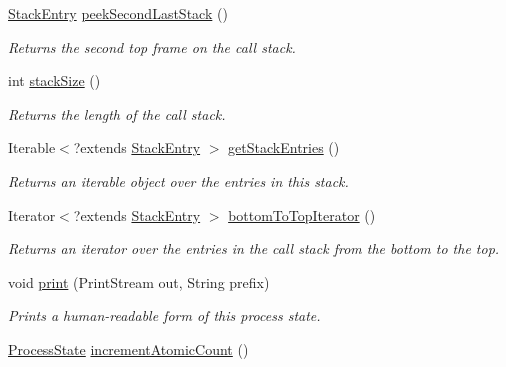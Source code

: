\begin{DoxyCompactItemize}
\hyperlink{interfaceedu_1_1udel_1_1cis_1_1vsl_1_1civl_1_1state_1_1IF_1_1StackEntry}{Stack\+Entry} \hyperlink{interfaceedu_1_1udel_1_1cis_1_1vsl_1_1civl_1_1state_1_1IF_1_1ProcessState_afa7894316d4343bb6b1a449f495db020}{peek\+Second\+Last\+Stack} ()
\begin{DoxyCompactList}\small\item\em Returns the second top frame on the call stack. \end{DoxyCompactList}\item 
int \hyperlink{interfaceedu_1_1udel_1_1cis_1_1vsl_1_1civl_1_1state_1_1IF_1_1ProcessState_a822f60d4dace4a05854192d3968efc21}{stack\+Size} ()
\begin{DoxyCompactList}\small\item\em Returns the length of the call stack. \end{DoxyCompactList}\item 
Iterable$<$?extends \hyperlink{interfaceedu_1_1udel_1_1cis_1_1vsl_1_1civl_1_1state_1_1IF_1_1StackEntry}{Stack\+Entry} $>$ \hyperlink{interfaceedu_1_1udel_1_1cis_1_1vsl_1_1civl_1_1state_1_1IF_1_1ProcessState_a069a17f0ca13e9675d44a5cd5fe9bc19}{get\+Stack\+Entries} ()
\begin{DoxyCompactList}\small\item\em Returns an iterable object over the entries in this stack. \end{DoxyCompactList}\item 
Iterator$<$?extends \hyperlink{interfaceedu_1_1udel_1_1cis_1_1vsl_1_1civl_1_1state_1_1IF_1_1StackEntry}{Stack\+Entry} $>$ \hyperlink{interfaceedu_1_1udel_1_1cis_1_1vsl_1_1civl_1_1state_1_1IF_1_1ProcessState_aa4cee20d99612ca501a63fe9f0142587}{bottom\+To\+Top\+Iterator} ()
\begin{DoxyCompactList}\small\item\em Returns an iterator over the entries in the call stack from the bottom to the top. \end{DoxyCompactList}\item 
void \hyperlink{interfaceedu_1_1udel_1_1cis_1_1vsl_1_1civl_1_1state_1_1IF_1_1ProcessState_a5eec7c6c472de4094774b7c786073749}{print} (Print\+Stream out, String prefix)
\begin{DoxyCompactList}\small\item\em Prints a human-\/readable form of this process state. \end{DoxyCompactList}\item 
\hyperlink{interfaceedu_1_1udel_1_1cis_1_1vsl_1_1civl_1_1state_1_1IF_1_1ProcessState}{Process\+State} \hyperlink{interfaceedu_1_1udel_1_1cis_1_1vsl_1_1civl_1_1state_1_1IF_1_1ProcessState_a14f3ebfbb30651893390fb62b7f3e545}{increment\+Atomic\+Count} ()

\end{DoxyCompactItemize}
